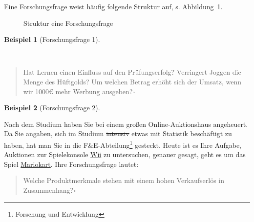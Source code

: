 \documentclass[
  a4paper,
  DIV=11]{scrreprt}
\theoremstyle{definition}
\theoremstyle{definition}
\newtheorem{example}{Beispiel}[chapter]
\theoremstyle{definition}
\theoremstyle{remark}
\begin{document}
Eine Forschungsfrage weist häufig folgende Struktur auf, s.
Abbildung~\ref{fig-fo-struktur}.

\begin{figure}


\caption{\label{fig-fo-struktur}Struktur eine Forschungsfrage}

\end{figure}%

\begin{example}[Forschungsfrage
1]\protect\hypertarget{exm-fofrage1}{}\label{exm-fofrage1}

~

\begin{quote}
Hat Lernen einen Einfluss auf den Prüfungserfolg? Verringert Joggen die
Menge des Hüftgolds? Um welchen Betrag erhöht sich der Umsatz, wenn wir
1000€ mehr Werbung ausgeben?\(\square\)
\end{quote}

\end{example}

\begin{example}[Forschungsfrage
2]\protect\hypertarget{exm-fofrage2}{}\label{exm-fofrage2}

Nach dem Studium haben Sie bei einem großen Online-Auktionshaus
angeheuert. Da Sie angaben, sich im Studium \st{intensiv} etwas mit
Statistik beschäftigt zu haben, hat man Sie in die
F\&E-Abteilung\footnote{Forschung und Entwicklung} gesteckt. Heute ist
es Ihre Aufgabe, Auktionen zur Spielekonsole
\href{https://www.nintendo.de/Wii/Wii-94559.html}{Wii} zu untersuchen,
genauer gesagt, geht es um das Spiel
\href{https://www.nintendo.de/Spiele/Wii/Mario-Kart-Wii-281848.html\#_bersicht}{Mariokart}.
Ihre Forschungsfrage lautet:

\begin{quote}
Welche Produktmerkmale stehen mit einem hohen Verkaufserlös in
Zusammenhang?\(\square\)
\end{quote}

\end{example}
\end{document}
